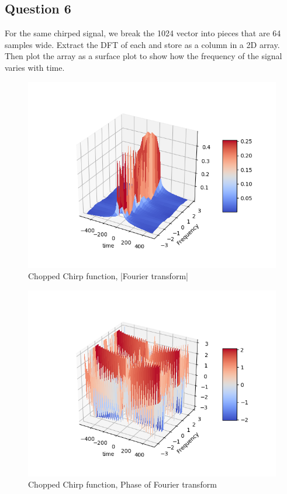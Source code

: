 \documentclass[11pt, a4paper]{article}
\begin{document}
\subsection{Question 6}
For the same chirped signal, we break the 1024 vector into pieces that are 64 samples wide.
Extract the DFT of each and store as a column in a 2D array. Then plot the array as a surface plot to show how the frequency of the signal varies with time.


\begin{figure}[h!]
\centering
\includegraphics[scale=0.6]{fig13.png}
\caption{Chopped Chirp function, |Fourier transform|}
\label{fig:universe}
\end{figure}

\begin{figure}[h!]
\centering
\includegraphics[scale=0.6]{fig14.png}
\caption{Chopped Chirp function, Phase of Fourier transform}
\label{fig:universe}
\end{figure}

\newpage
\end{document}
